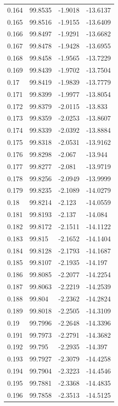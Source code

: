 \begin{tabular}{llll}
0.164 & 99.8535 & -1.9018 & -13.6137 \\
0.165 & 99.8516 & -1.9155 & -13.6409 \\
0.166 & 99.8497 & -1.9291 & -13.6682 \\
0.167 & 99.8478 & -1.9428 & -13.6955 \\
0.168 & 99.8458 & -1.9565 & -13.7229 \\
0.169 & 99.8439 & -1.9702 & -13.7504 \\
0.17 & 99.8419 & -1.9839 & -13.7779 \\
0.171 & 99.8399 & -1.9977 & -13.8054 \\
0.172 & 99.8379 & -2.0115 & -13.833 \\
0.173 & 99.8359 & -2.0253 & -13.8607 \\
0.174 & 99.8339 & -2.0392 & -13.8884 \\
0.175 & 99.8318 & -2.0531 & -13.9162 \\
0.176 & 99.8298 & -2.067 & -13.944 \\
0.177 & 99.8277 & -2.081 & -13.9719 \\
0.178 & 99.8256 & -2.0949 & -13.9999 \\
0.179 & 99.8235 & -2.1089 & -14.0279 \\
0.18 & 99.8214 & -2.123 & -14.0559 \\
0.181 & 99.8193 & -2.137 & -14.084 \\
0.182 & 99.8172 & -2.1511 & -14.1122 \\
0.183 & 99.815 & -2.1652 & -14.1404 \\
0.184 & 99.8128 & -2.1793 & -14.1687 \\
0.185 & 99.8107 & -2.1935 & -14.197 \\
0.186 & 99.8085 & -2.2077 & -14.2254 \\
0.187 & 99.8063 & -2.2219 & -14.2539 \\
0.188 & 99.804 & -2.2362 & -14.2824 \\
0.189 & 99.8018 & -2.2505 & -14.3109 \\
0.19 & 99.7996 & -2.2648 & -14.3396 \\
0.191 & 99.7973 & -2.2791 & -14.3682 \\
0.192 & 99.795 & -2.2935 & -14.397 \\
0.193 & 99.7927 & -2.3079 & -14.4258 \\
0.194 & 99.7904 & -2.3223 & -14.4546 \\
0.195 & 99.7881 & -2.3368 & -14.4835 \\
0.196 & 99.7858 & -2.3513 & -14.5125 \\

\end{tabular}
